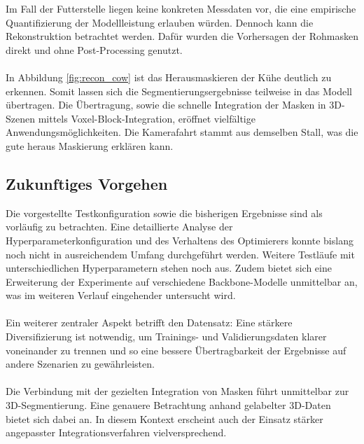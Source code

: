 \documentclass[12pt,DIV=15,BCOR=15mm,twoside,headsepline,abstract=true,listof=totoc,bibliography=totoc]{scrreprt}
\theoremstyle{remark}    %
\begin{document}
    Im Fall der Futterstelle liegen keine konkreten Messdaten vor, die eine empirische Quantifizierung der Modellleistung erlauben würden. Dennoch kann die Rekonstruktion 
    betrachtet werden. Dafür wurden die Vorhersagen der Rohmasken direkt und ohne Post-Processing genutzt. \\\\
    In Abbildung \ref{fig:recon_cow} ist das Herausmaskieren der Kühe deutlich zu erkennen. Somit lassen sich die 
    Segmentierungsergebnisse teilweise in das Modell übertragen. Die Übertragung, sowie die schnelle Integration der Masken 
    in 3D-Szenen mittels Voxel-Block-Integration, eröffnet vielfältige Anwendungsmöglichkeiten.
    Die Kamerafahrt stammt aus demselben Stall, was die gute heraus Maskierung erklären kann. 
    \subsection{Zukunftiges Vorgehen}
    Die vorgestellte Testkonfiguration sowie die bisherigen Ergebnisse sind als vorläufig zu betrachten. 
    Eine detaillierte Analyse der Hyperparameterkonfiguration und des Verhaltens des Optimierers konnte bislang noch nicht in ausreichendem 
    Umfang durchgeführt werden. Weitere Testläufe mit unterschiedlichen Hyperparametern stehen noch aus. Zudem bietet sich eine Erweiterung der Experimente 
    auf verschiedene Backbone-Modelle unmittelbar an, was im weiteren Verlauf eingehender untersucht wird. \\\\
    Ein weiterer zentraler Aspekt betrifft den Datensatz: Eine stärkere Diversifizierung ist notwendig, um Trainings- und Validierungsdaten klarer voneinander 
    zu trennen und so eine bessere Übertragbarkeit der Ergebnisse auf andere Szenarien zu gewährleisten.\\\\    
    Die Verbindung mit der gezielten Integration von Masken führt unmittelbar zur 3D-Segmentierung. Eine genauere Betrachtung anhand gelabelter 
    3D-Daten bietet sich dabei an. In diesem Kontext erscheint auch der Einsatz stärker angepasster Integrationsverfahren vielversprechend.
\end{document}
